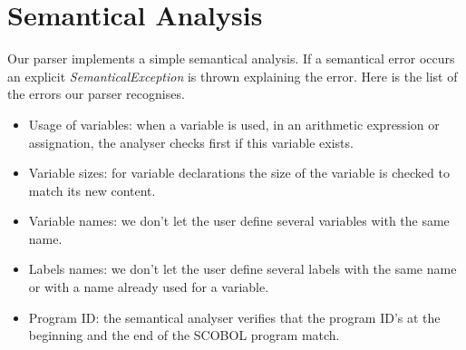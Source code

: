 \section{Semantical Analysis}

Our parser implements a simple semantical analysis. If a semantical error occurs an explicit \emph{SemanticalException} is thrown explaining the error. Here is the list of the errors our parser recognises.

\begin{itemize}

\item Usage of variables: when a variable is used, in an arithmetic expression or assignation, the analyser checks first if this variable exists.
\item Variable sizes: for variable declarations the size of the variable is checked to match its new content.
\item Variable names: we don't let the user define several variables with the same name.
\item Labels names: we don't let the user define several labels with the same name or with a name already used for a variable.
\item Program ID: the semantical analyser verifies that the program ID's at the beginning and the end of the SCOBOL program match.

\end {itemize}


